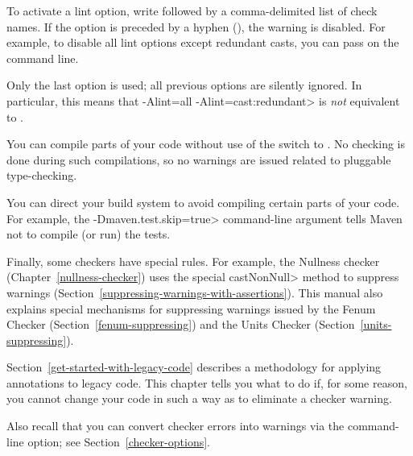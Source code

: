 
\noindent
To activate a lint option, write  followed by a
comma-delimited list of check names.  If the option is preceded by a
hyphen (\code{-}), the warning is disabled.  For example, to disable all
lint options except redundant casts, you can pass
 on the command line.

Only the last  option is used; all previous 
options are silently ignored.  In particular, this means that \<-Alint=all
-Alint=cast:redundant> is \emph{not} equivalent to
.



You can compile parts of your code without use of the
 switch to .  No checking is done during
such compilations, so no warnings are issued related to pluggable
type-checking.

You can direct your build system to avoid compiling certain parts of your
code.  For example, the \<-Dmaven.test.skip=true> command-line argument
tells Maven not to compile (or run) the tests.



Finally, some checkers have special rules.  For example, the Nullness
checker (Chapter~\ref{nullness-checker}) uses
the special \<castNonNull> method to suppress warnings
(Section~\ref{suppressing-warnings-with-assertions}).
This manual also explains special mechanisms for
suppressing warnings issued by the Fenum Checker
(Section~\ref{fenum-suppressing}) and the Units Checker
(Section~\ref{units-suppressing}).



\htmlhr
{}

Section~\ref{get-started-with-legacy-code} describes a methodology for
applying annotations to legacy code.  This chapter tells you what to do if,
for some reason, you cannot change your code in such a way as to eliminate
a checker warning.

Also recall that you can convert checker errors into warnings via the
 command-line option; see Section~\ref{checker-options}.



